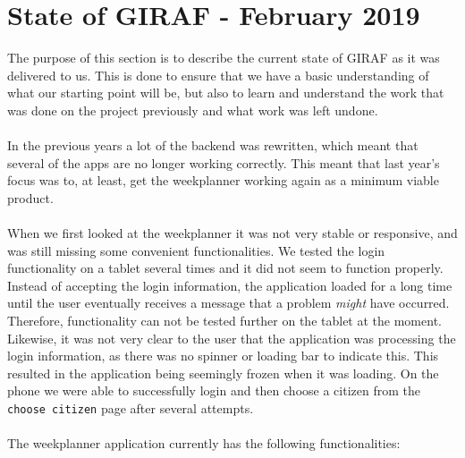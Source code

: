 \section{State of GIRAF - February 2019}
The purpose of this section is to describe the current state of GIRAF as it was delivered to us.
This is done to ensure that we have a basic understanding of what our starting point will be, but also to learn and understand the work that was done on the project previously and what work was left undone.
\\\\
In the previous years a lot of the backend was rewritten, which meant that several of the apps are no longer working correctly.
This meant that last year's focus was to, at least, get the weekplanner working again as a minimum viable product.
\\\\
When we first looked at the weekplanner it was not very stable or responsive, and was still missing some convenient functionalities.
We tested the login functionality on a tablet several times and it did not seem to function properly.
Instead of accepting the login information, the application loaded for a long time until the user eventually receives a message that a problem \textit{might} have occurred.
Therefore, functionality can not be tested further on the tablet at the moment.
Likewise, it was not very clear to the user that the application was processing the login information, as there was no spinner or loading bar to indicate this.
This resulted in the application being seemingly frozen when it was loading.
On the phone we were able to successfully login and then choose a citizen from the \texttt{choose citizen} page after several attempts.
\\\\
The weekplanner application currently has the following functionalities:
